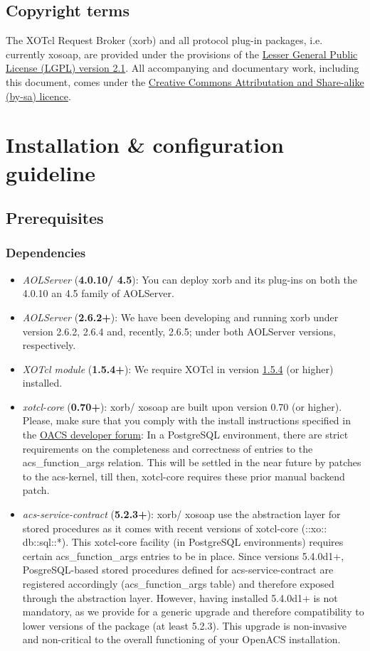 \subsection{Copyright terms}
The XOTcl Request Broker (xorb) and all protocol plug-in packages, i.e. currently xosoap, are provided 
under the provisions of the \href{http://creativecommons.org/licenses/LGPL/2.1/}{Lesser General Public 
License (LGPL) version 2.1}. All accompanying and documentary work, including this document, comes 
under the \href{http://creativecommons.org/licenses/by-sa/2.0/at/}{Creative Commons Attributation and 
Share-alike (by-sa) licence}.

     \section{Installation \& configuration guideline}
     	\subsection{Prerequisites}
	\subsubsection{Dependencies}
	\begin{itemize}
	\item \emph{AOLServer} (\textbf{4.0.10/ 4.5}): You can deploy xorb and its plug-ins on both the 4.0.10 an 4.5 family of AOLServer.
	\item \emph{AOLServer} (\textbf{2.6.2+}): We have been developing and running xorb under version 2.6.2, 2.6.4 and, recently, 2.6.5; under both AOLServer versions, respectively.
	\item \emph{XOTcl module} (\textbf{1.5.4+}): We require XOTcl in version \href{http://media.wu-wien.ac.at/download/xotcl-1.5.4.tar.gz}{1.5.4} (or higher) installed.
	\item \emph{xotcl-core} (\textbf{0.70+}): xorb/ xosoap are built upon version 0.70 (or higher).
	 Please, make sure that you comply with the install instructions specified in the \href{http://openacs.org/forums/message-view?message_id=1165990}{OACS developer forum}: In a PostgreSQL environment, there are strict requirements on the completeness and correctness of entries to the acs\_function\_args relation. This will be settled in the near future by patches to the acs-kernel, till then, xotcl-core requires these prior manual backend patch.
	\item \emph{acs-service-contract} (\textbf{5.2.3+}): xorb/ xosoap use the abstraction layer for stored procedures as it comes with recent versions of xotcl-core (::xo:: db::sql::*). This xotcl-core facility (in PostgreSQL environments) requires certain acs\_function\_args entries to be in place. Since versions 5.4.0d1+, PosgreSQL-based stored procedures defined for acs-service-contract  are registered accordingly (acs\_function\_args table) and therefore exposed through the abstraction layer. However, having installed 5.4.0d1+ is not mandatory, as we provide for a generic upgrade and therefore compatibility to lower versions of the package (at least 5.2.3). This upgrade is non-invasive and non-critical to the overall functioning of your OpenACS installation.
	\end{itemize}
